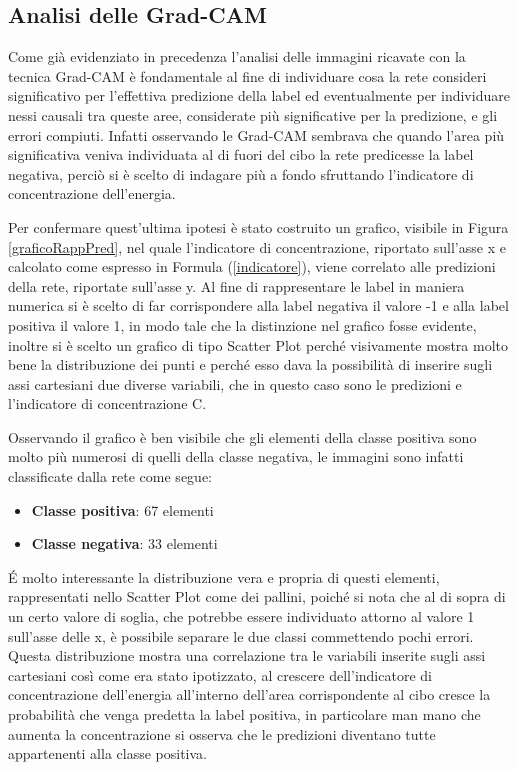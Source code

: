 \subsection{Analisi delle Grad-CAM}
\label{analisiGradCAM}
Come già evidenziato in precedenza l'analisi delle immagini ricavate con la tecnica Grad-CAM è fondamentale al fine di individuare cosa la rete consideri significativo per l'effettiva predizione della label ed eventualmente per individuare nessi causali tra queste aree, considerate più significative per la predizione, e gli errori compiuti. Infatti osservando le Grad-CAM sembrava che quando l'area più significativa veniva individuata al di fuori del cibo la rete predicesse la label negativa, perciò si è scelto di indagare più a fondo sfruttando l'indicatore di concentrazione dell'energia. 

Per confermare quest'ultima ipotesi è stato costruito un grafico, visibile in Figura \ref{graficoRappPred}, nel quale l'indicatore di concentrazione, riportato sull'asse x e calcolato come espresso in Formula (\ref{indicatore}), viene correlato alle predizioni della rete, riportate sull'asse y. Al fine di rappresentare le label in maniera numerica si è scelto di far corrispondere alla label negativa il valore -1 e alla label positiva il valore 1, in modo tale che la distinzione nel grafico fosse evidente, inoltre si è scelto un grafico di tipo Scatter Plot perché visivamente mostra molto bene la distribuzione dei punti e perché esso dava la possibilità di inserire sugli assi cartesiani due diverse variabili, che in questo caso sono le predizioni e l'indicatore di concentrazione C.

Osservando il grafico è ben visibile che gli elementi della classe positiva sono molto più numerosi di quelli della classe negativa, le immagini sono infatti classificate dalla rete come segue:
\newpage
\begin{itemize}
\item \textbf{Classe positiva}: 67 elementi
\item \textbf{Classe negativa}: 33 elementi
\end{itemize}

É molto interessante la distribuzione vera e propria di questi elementi, rappresentati nello Scatter Plot come dei pallini, poiché si nota che al di sopra di un certo valore di soglia, che potrebbe essere individuato attorno al valore 1 sull'asse delle x, è possibile separare le due classi commettendo pochi errori. Questa distribuzione mostra una correlazione tra le variabili inserite sugli assi cartesiani così come era stato ipotizzato, al crescere dell'indicatore di concentrazione dell'energia all'interno dell'area corrispondente al cibo cresce la probabilità che venga predetta la label positiva, in particolare man mano che aumenta la concentrazione si osserva che le predizioni diventano tutte appartenenti alla classe positiva.

